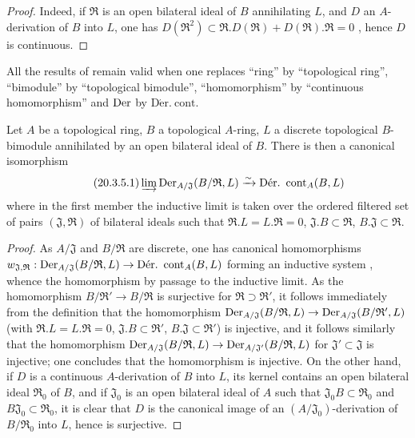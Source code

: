 \begin{proof}
Indeed, if $\mathfrak{R}$ is an open bilateral ideal of $B$ annihilating $L$, and $D$ an $A$-derivation of $B$ into $L$, one has $D(\mathfrak{R}^2)\subset\mathfrak{R}.D(\mathfrak{R})+D(\mathfrak{R}).\mathfrak{R}=0$ , hence $D$ is continuous.
\end{proof}

\begin{env}[20.3.4]
\label{0.20.3.4}
All the results of  remain valid when one replaces ``ring'' by ``topological ring'', ``bimodule'' by ``topological bimodule'', ``homomorphism'' by ``continuous homomorphism'' and $\operatorname{Der}$ by $\operatorname{D\acute{e}r.\ cont}$.
\end{env}

\begin{proposition}[20.3.5]
\label{0.20.3.5}
Let $A$ be a topological ring, $B$ a topological $A$-ring, $L$ a discrete topological $B$-bimodule annihilated by an open bilateral ideal of $B$.
There is then a canonical isomorphism
\begin{equation}
\tag{20.3.5.1}
  \label{0.20.3.5.1}
  \varinjlim\Der_{A/\mathfrak{J}}(B/\mathfrak{R},L)\xrightarrow{\sim}\operatorname{D\acute{e}r.\ cont}_A(B,L)
\end{equation}
where in the first member the inductive limit is taken over the ordered filtered set of pairs $(\mathfrak{J},\mathfrak{R})$ of bilateral ideals such that $\mathfrak{R}.L=L.\mathfrak{R}=0$, $\mathfrak{J}.B\subset\mathfrak{R}$, $B.\mathfrak{J}\subset\mathfrak{R}$.
\end{proposition}

\begin{proof}
As $A/\mathfrak{J}$ and $B/\mathfrak{R}$ are discrete, one has canonical homomorphisms $w_{\mathfrak{J},\mathfrak{R}}:\Der_{A/\mathfrak{J}}(B/\mathfrak{R},L)\to\operatorname{D\acute{e}r.\ cont}_A(B,L)$ forming an inductive system , whence the homomorphism  by passage to the inductive limit.
As the homomorphism $B/\mathfrak{R}'\to B/\mathfrak{R}$ is surjective for $\mathfrak{R}\supset\mathfrak{R}'$, it follows immediately from the definition that the homomorphism $\operatorname{Der}_{A/\mathfrak{J}}(B/\mathfrak{R},L)\to\operatorname{Der}_{A/\mathfrak{J}}(B/\mathfrak{R}',L)$ (with $\mathfrak{R}.L=L.\mathfrak{R}=0$, $\mathfrak{J}.B\subset\mathfrak{R}'$, $B.\mathfrak{J}\subset\mathfrak{R}'$) is injective, and it follows similarly that the homomorphism $\operatorname{Der}_{A/\mathfrak{J}}(B/\mathfrak{R},L)\to\operatorname{Der}_{A/\mathfrak{J}'}(B/\mathfrak{R},L)$ for $\mathfrak{J}'\subset\mathfrak{J}$  is injective; one concludes that the homomorphism  is injective.
On the other hand, if $D$ is a continuous $A$-derivation of $B$ into $L$, its kernel contains an open bilateral ideal $\mathfrak{R}_0$ of $B$, and if $\mathfrak{J}_0$ is an open bilateral ideal of $A$ such that $\mathfrak{J}_0 B\subset\mathfrak{R}_0$ and $B\mathfrak{J}_0\subset\mathfrak{R}_0$, it is clear that $D$ is the canonical image of an $(A/\mathfrak{J}_0)$-derivation of $B/\mathfrak{R}_0$ into $L$, hence  is surjective.
\end{proof}


